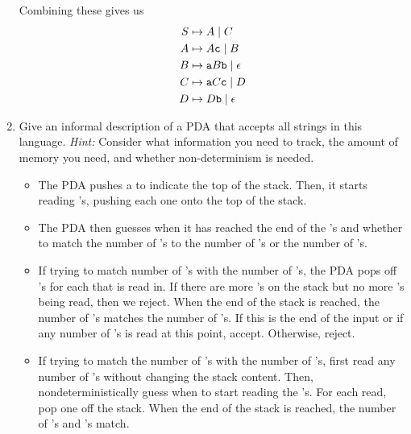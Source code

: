\documentclass[letterpaper]{article}
\begin{document}
\begin{enumerate}
\begin{mdframed}[]
        Combining these gives us 
        \begin{equation*}
            \begin{aligned}
                S &\mapsto A \mid C \\ 
                A &\mapsto A\texttt{c} \mid B \\ 
                B &\mapsto \texttt{a}B\texttt{b} \mid \epsilon \\ 
                C &\mapsto \texttt{a}C\texttt{c} \mid D \\ 
                D &\mapsto D\texttt{b} \mid \epsilon
            \end{aligned}
        \end{equation*}
    \end{mdframed}

    \item Give an informal description of a PDA that accepts all strings in this language. \emph{Hint:} Consider what information you need to track, the amount of memory you need, and whether non-determinism is needed.
    
    \begin{mdframed}[]
        \begin{itemize}
            \item The PDA pushes a \code{\$} to indicate the top of the stack. Then, it starts reading 's, pushing each one onto the top of the stack.
            \item The PDA then guesses when it has reached the end of the 's and whether to match the number of 's to the number of 's or the number of 's. 
            \item If trying to match number of 's with the number of 's, the PDA pops off 's for each  that is read in. If there are more 's on the stack but no more 's being read, then we reject. When the end of the stack \code{\$} is reached, the number of 's matches the number of 's. If this is the end of the input or if any number of 's is read at this point, accept. Otherwise, reject. 
            \item If trying to match the number of 's with the number of 's, first read any number of 's without changing the stack content. Then, nondeterministically guess when to start reading the 's. For each  read, pop one  off the stack. When the end of the stack \code{\$} is reached, the number of 's and 's match. 
        \end{itemize}
    \end{mdframed}


\end{enumerate}
\end{document}
